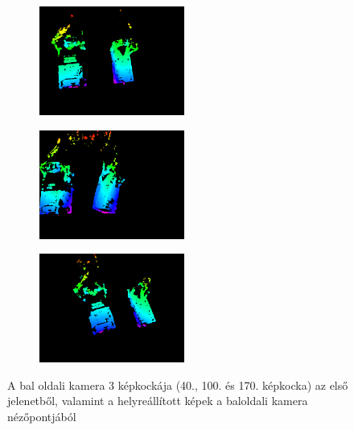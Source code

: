 \begin{figure}[t!]
\begin{subfigure}[b]{.32\linewidth}
	\centering
	\includegraphics[width=135pt]{figures/vis_93.png}
  \end{subfigure}
\begin{subfigure}[b]{.32\linewidth}
	\centering
	\includegraphics[width=135pt]{figures/vis_153.png}
  \end{subfigure}
\begin{subfigure}[b]{.32\linewidth}
	\centering
	\includegraphics[width=135pt]{figures/vis_223.png}
  \end{subfigure}
\caption{A bal oldali kamera 3 képkockája (40., 100. és 170. képkocka) az első jelenetből, valamint a helyreállított képek a baloldali kamera nézőpontjából \label{fig:scene1_frames}}

\vspace{10pt}


\end{figure}

